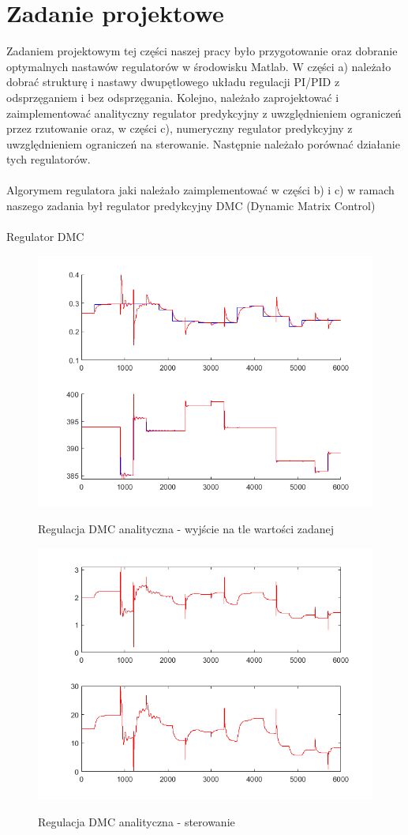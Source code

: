 \chapter{Zadanie projektowe}

Zadaniem projektowym tej części naszej pracy było przygotowanie oraz dobranie optymalnych nastawów regulatorów w środowisku Matlab. W części a) należało dobrać strukturę i nastawy dwupętlowego układu regulacji PI/PID z odsprzęganiem i bez odsprzęgania. Kolejno, należało zaprojektować i zaimplementować analityczny regulator predykcyjny z uwzględnieniem ograniczeń przez rzutowanie oraz, w części c), numeryczny regulator predykcyjny z uwzględnieniem ograniczeń na sterowanie. Następnie należało porównać działanie tych regulatorów.
\\\\ Algorymem regulatora jaki należało zaimplementować w części b) i c) w ramach naszego zadania był regulator predykcyjny DMC (Dynamic Matrix Control)\\\\

Regulator DMC


\begin{figure}[h!]
	\centering
	\includegraphics[width=.6\linewidth]{img/yDMC.png}
	\label{ch2:regulator}
	\caption{Regulacja DMC analityczna - wyjście na tle wartości zadanej}
\end{figure}

\begin{figure}[h!]
	\centering
	\includegraphics[width=.6\linewidth]{img/uDMC.png}
	\label{ch2:regulator}
	\caption{Regulacja DMC analityczna - sterowanie}
\end{figure}



